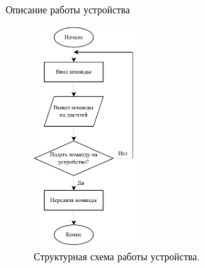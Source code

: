 \documentclass[10pt]{beamer}
\begin{document}
\begin{frame}{Описание работы устройства}
  \begin{figure}
 	 \includegraphics[width=0.35\textwidth]{struct}
 	 \caption{Структурная схема работы устройства.}
  \end{figure}
\end{frame}
\end{document}
